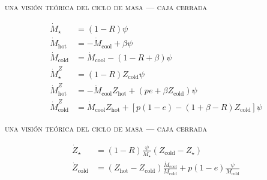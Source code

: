 \documentclass[xcolor=dvipsnames,4pt,hyperref={colorlinks,citecolor=black,linkcolor=black,urlcolor=black}]{beamer}
\begin{document}
\begin{frame}{\textsc{una visión teórica del ciclo de masa --- caja cerrada}}


%
\begin{subequations}
\begin{align}
\dot{M}_\star         &= (1-R)\psi \\
\dot{M}_\text{hot}    &= -\dot{M}_\text{cool} + \beta\psi \\
\dot{M}_\text{cold}   &= \dot{M}_\text{cool} - (1-R+\beta)\psi \\
\dot{M}_\star^Z       &= (1-R)Z_\text{cold}\psi \\
\dot{M}_\text{hot}^Z  &= -\dot{M}_\text{cool}Z_\text{hot} + (pe+\beta Z_\text{cold})\psi \\
\dot{M}_\text{cold}^Z &= \dot{M}_\text{cool}Z_\text{hot} + [p(1-e)-(1+\beta-R)Z_\text{cold}]\psi
\end{align}
\end{subequations}
\end{frame}

\begin{frame}{\textsc{una visión teórica del ciclo de masa --- caja cerrada}}

%
\begin{subequations}
\begin{align}
\dot{Z}_\star       &= (1-R)\frac{\psi}{M_\star}(Z_\text{cold}-Z_\star) \\
\dot{Z}_\text{cold} &= (Z_\text{hot}-Z_\text{cold})\frac{\dot{M}_\text{cool}}{M_\text{cold}} + p(1-e)\frac{\psi}{M_\text{cold}}
\end{align}
\end{subequations}
\end{frame}
\end{document}
